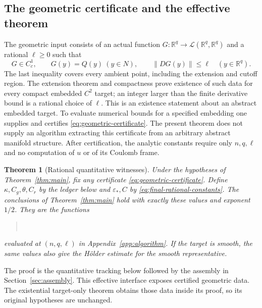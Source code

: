 \documentclass[reqno,11pt]{amsart}
\numberwithin{equation}{section}
\newtheorem{theorem}{Theorem}[section]
\theoremstyle{definition}
\theoremstyle{remark}
\newcommand{\R}{\mathbb R}
\newcommand{\norm}[1]{\left\lVert#1\right\rVert}
\begin{document}
\subsection{The geometric certificate and the effective theorem}
The geometric input consists of an actual function
$G:\R^q\to\mathcal L(\R^q,\R^q)$ and a rational $\ell\geq0$ such that
\begin{equation}\label{eq:geometric-certificate}
 G\in C_c^1,\qquad G(y)=Q(y)\ (y\in N),\qquad
 \norm{DG(y)}\leq\ell\quad(y\in\R^q).
\end{equation}
The last inequality covers every ambient point, including the extension
and cutoff region. The extension theorem and compactness prove existence
of such data for every compact embedded $C^2$ target; an integer larger
than the finite derivative bound is a rational choice of $\ell$.
This is an existence statement about an abstract embedded target.
To evaluate numerical bounds for a specified embedding one supplies and
certifies \eqref{eq:geometric-certificate}. The present theorem does not
supply an algorithm extracting this certificate from an arbitrary abstract
manifold structure. After certification, the analytic constants require
only $n,q,\ell$ and no computation of $u$ or of its Coulomb frame.

\begin{theorem}[Rational quantitative witnesses]\label{thm:effective}
Under the hypotheses of Theorem~\ref{thm:main}, fix any certificate
\eqref{eq:geometric-certificate}. Define $\kappa,C_g,\theta,C_r$ by the
ledger below and $\varepsilon_*,C$ by
\eqref{eq:final-rational-constants}. The conclusions of
Theorem~\ref{thm:main} hold with exactly these values and exponent $1/2$.
They are the functions
\begin{quote}
\\
\end{quote}
evaluated at $(n,q,\ell)$ in Appendix~\ref{app:algorithm}. If the target is smooth, the same values
also give the H\"older estimate for the smooth representative.
\end{theorem}
The proof is the quantitative tracking below followed by the assembly in
Section~\ref{sec:assembly}. This effective interface exposes certified
geometric data. The existential target-only theorem obtains those data
inside its proof, so its original hypotheses are unchanged.
\end{document}
